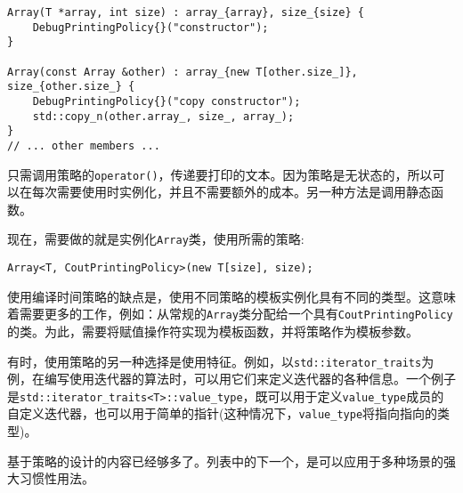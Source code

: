 \begin{lstlisting}[style=styleCXX]
Array(T *array, int size) : array_{array}, size_{size} {
	DebugPrintingPolicy{}("constructor");
}

Array(const Array &other) : array_{new T[other.size_]},
size_{other.size_} {
	DebugPrintingPolicy{}("copy constructor");
	std::copy_n(other.array_, size_, array_);
}
// ... other members ...
\end{lstlisting}

只需调用策略的\texttt{operator()}，传递要打印的文本。因为策略是无状态的，所以可以在每次需要使用时实例化，并且不需要额外的成本。另一种方法是调用静态函数。

现在，需要做的就是实例化\texttt{Array}类，使用所需的策略:

\begin{lstlisting}[style=styleCXX]
Array<T, CoutPrintingPolicy>(new T[size], size);
\end{lstlisting}

使用编译时间策略的缺点是，使用不同策略的模板实例化具有不同的类型。这意味着需要更多的工作，例如：从常规的\texttt{Array}类分配给一个具有\texttt{CoutPrintingPolicy}的类。为此，需要将赋值操作符实现为模板函数，并将策略作为模板参数。

有时，使用策略的另一种选择是使用特征。例如，以\texttt{std::iterator\_traits}为例，在编写使用迭代器的算法时，可以用它们来定义迭代器的各种信息。一个例子是\texttt{std::iterator\_traits<T>::value\_type}，既可以用于定义\texttt{value\_type}成员的自定义迭代器，也可以用于简单的指针(这种情况下，\texttt{value\_type}将指向指向的类型)。

基于策略的设计的内容已经够多了。列表中的下一个，是可以应用于多种场景的强大习惯性用法。








